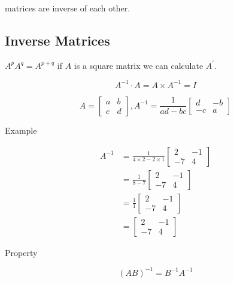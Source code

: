 \documentclass[main.tex]{subfiles}
\begin{document}
    matrices are inverse of each other.

\subsection{Inverse Matrices}

    $A^{p} A^{q}= A^{p+q}$ if $A$ is a square matrix we can calculate $A^{\prime}$.
    
    $$
    A^{-1} \cdot A = A \times A^{-1} = I
    $$
    
    $$
    A=\left[\begin{array}{ll}
    a & b \\
    c & d
    \end{array}\right], A^{-1}=\frac{1}{ad - bc}\left[\begin{array}{cc}
    d & -b \\
    -c & a
    \end{array}\right]
    $$
    
    Example
    
    $$
    \begin{aligned}
    A^{-1} & = \frac{1}{4 \times 2 - 2 \times 1}\left[\begin{array}{cc}
    2 & -1 \\
    -7 & 4
    \end{array}\right]\\
    & =\frac{1}{8-7}\left[\begin{array}{cc}
    2 & -1 \\
    -7 & 4
    \end{array}\right]\\
    & =\frac{1}{1}\left[\begin{array}{cc}
    2 & -1 \\
    -7 & 4
    \end{array}\right]\\
    & =\left[\begin{array}{cc}
    2 & -1 \\
    -7 & 4
    \end{array}\right]
    \end{aligned}
    $$

    Property 
    
    $$
    (A B)^{-1}=B^{-1} A^{-1}
    $$
\end{document}
